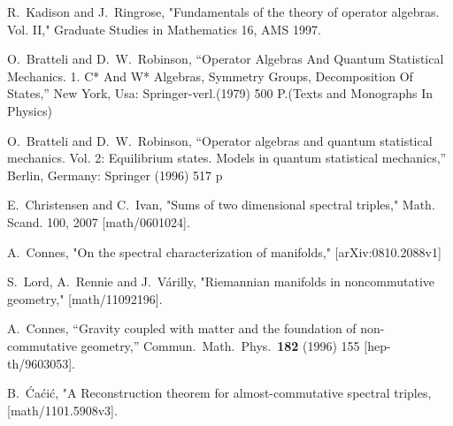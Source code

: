 \documentclass[12pt]{article}
\begin{document}
\begin{thebibliography}{99}
  R.~Kadison and J.~Ringrose,
    "Fundamentals of the theory of operator algebras. {V}ol. {II},"
   Graduate Studies in Mathematics 16, AMS 1997.
    


  O.~Bratteli and D.~W.~Robinson,
  ``Operator Algebras And Quantum Statistical Mechanics. 1. C* And W* Algebras, Symmetry Groups, Decomposition Of States,''
  New York, Usa: Springer-verl.(1979) 500 P.(Texts and Monographs In Physics)

  O.~Bratteli and D.~W.~Robinson,
  ``Operator algebras and quantum statistical mechanics. Vol. 2: Equilibrium states. Models in quantum statistical mechanics,''
  Berlin, Germany: Springer (1996) 517 p








E.~Christensen and C.~Ivan, "Sums of two dimensional spectral triples," Math. Scand. 100, 2007 [math/0601024].







A.~Connes,
"On the spectral characterization of manifolds," [arXiv:0810.2088v1]








S.~Lord, A.~Rennie and J.~V\'arilly, "Riemannian manifolds in noncommutative geometry," [math/11092196].








  
A.~Connes,
``Gravity coupled with matter and the foundation of non-commutative
geometry,''
Commun.\ Math.\ Phys.\  {\bf 182} (1996) 155
[hep-th/9603053].







B.~\'Ca\'ci\'c, "A Reconstruction theorem for
almost-commutative spectral triples, [math/1101.5908v3].



















\end{thebibliography}
\end{document}
